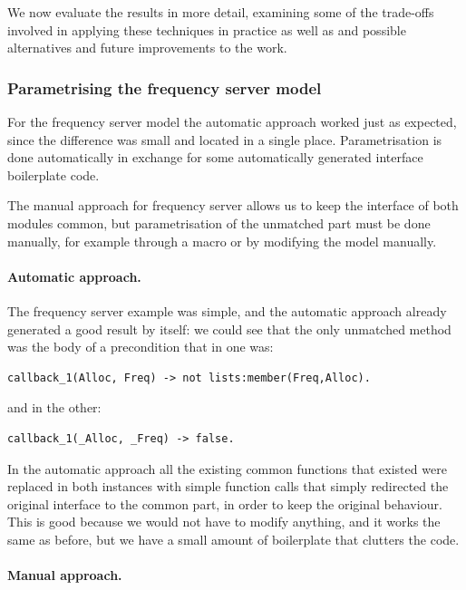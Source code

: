 We now evaluate the results in more detail, examining some of the trade-offs involved in applying these techniques in practice as well as and 
possible alternatives and future improvements to the work.

\subsubsection{Parametrising the frequency server model}

For the frequency server model the automatic approach worked just as expected, 
since the difference was small and located in a single place. Parametrisation 
is done automatically in exchange for some automatically generated interface 
boilerplate code.

The manual approach for frequency server allows us to keep the 
interface of both modules {\color{red}common}, but parametrisation of the 
unmatched part must be done manually, for example through a macro or by 
modifying the model manually.

\paragraph{Automatic approach.}

The frequency server example was simple, and the automatic approach 
already generated a good result by itself: we could see that the only 
unmatched method was the body of a precondition that in one was:

\begin{verbatim}
callback_1(Alloc, Freq) -> not lists:member(Freq,Alloc).
\end{verbatim}

and in the other:

\begin{verbatim}
callback_1(_Alloc, _Freq) -> false.
\end{verbatim}

In the automatic approach all the existing common functions that existed were replaced in both instances with simple function calls 
that simply redirected the original interface to the common part, in order to 
keep the original behaviour. This is good because we would not have to modify 
anything, and it works the same as before, but we have a small amount of 
boilerplate that clutters the code.

\paragraph{Manual approach.}

